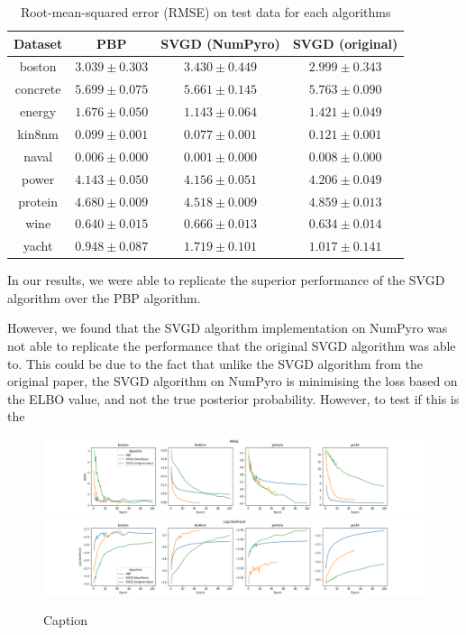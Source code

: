 \begin{table}[]
    \centering
\begin{tabular}{|c|ccc|}
\hline
 Dataset & PBP & SVGD (NumPyro) & SVGD (original)  \\
 \hline
boston & $3.039 \pm 0.303$ & $3.430 \pm 0.449$ & $2.999 \pm 0.343$ \\
concrete & $5.699 \pm 0.075$ & $5.661 \pm 0.145$ & $5.763 \pm 0.090$ \\
energy & $1.676 \pm 0.050$ & $1.143 \pm 0.064$ & $1.421 \pm 0.049$ \\
kin8nm & $0.099 \pm 0.001$ & $0.077 \pm 0.001$ & $0.121 \pm 0.001$ \\
naval & $0.006 \pm 0.000$ & $0.001 \pm 0.000$ & $0.008 \pm 0.000$ \\
power & $4.143 \pm 0.050$ & $4.156 \pm 0.051$ & $4.206 \pm 0.049$ \\
protein & $4.680 \pm 0.009$ & $4.518 \pm 0.009$ & $4.859 \pm 0.013$ \\
wine & $0.640 \pm 0.015$ & $0.666 \pm 0.013$ & $0.634 \pm 0.014$ \\
yacht & $0.948 \pm 0.087$ & $1.719 \pm 0.101$ & $1.017 \pm 0.141$ \\
\hline
\end{tabular}
    \caption{Root-mean-squared error (RMSE) on test data for each algorithms} 
    \label{tab:bnn_rmse}
\end{table}

In our results, we were able to replicate the superior performance of the SVGD algorithm over the PBP algorithm.

However, we found that the SVGD algorithm implementation on NumPyro was not able to replicate the performance that the original SVGD algorithm was able to. This could be due to the fact that unlike the SVGD algorithm from the original paper, the SVGD algorithm on NumPyro is minimising the loss based on the ELBO value, and not the true posterior probability. However, to test if this is the 

\begin{figure}[h]
    \centering
    \includegraphics[width=\textwidth]{figs/bayesian_epoch_RMSE.png}
    \includegraphics[width=\textwidth]{figs/bayesian_epoch_Loglikelihood.png}
    \caption{Caption}
    \label{fig:my_label}
\end{figure}